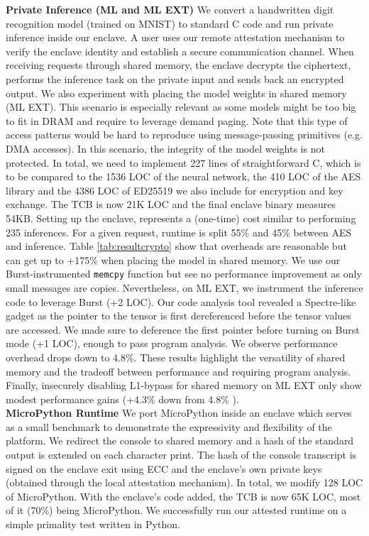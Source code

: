 \noindent\textbf{Private Inference (ML and ML EXT)}
\label{sec:evalprivateinference}
We convert a handwritten digit recognition model (trained on MNIST) to standard C code \cite{onnx2cgithub} and run private inference inside our enclave.
A user uses our remote attestation mechanism to verify the enclave identity and establish a secure communication channel.
When receiving requests through shared memory, the enclave decrypts the ciphertext, performs the inference task on the private input and sends back an encrypted output.
We also experiment with placing the model weights in shared memory (ML EXT).
This scenario is especially relevant as some models might be too big to fit in DRAM and require to leverage demand paging. 
Note that this type of access patterns would be hard to reproduce using message-passing primitives (e.g. DMA accesses).
In this scenario, the integrity of the model weights is not protected.
In total, we need to implement 227 lines of straightforward C, which is to be compared to the 1536 LOC of the neural network, the 410 LOC of the AES library and the 4386 LOC of ED25519 we also include
for encryption and key exchange.
The TCB is now 21K LOC and the final enclave binary measures 54KB.
Setting up the enclave, represents a (one-time) cost similar to performing 235 inferences.
For a given request, runtime is split 55\% and 45\% between AES and inference.
Table \ref{tab:resultcrypto} show that overheads are reasonable but can get up to +175\% when placing the model in shared memory.
We use our Burst-instrumented \texttt{memcpy} function but see no performance improvement as only small messages are copies.
Nevertheless, on ML EXT, we instrument the inference code to leverage Burst (+2 LOC).
Our code analysis tool revealed a Spectre-like gadget as the pointer to the tensor is first dereferenced before the tensor values are accessed.
We made sure to deference the first pointer before turning on Burst mode (+1 LOC), enough to pass program analysis.
We observe performance overhead drops down to 4.8\%. 
These results highlight the versatility of shared memory and the tradeoff between performance and requiring program analysis.
Finally, insecurely disabling L1-bypass for shared memory on ML EXT only show modest performance gains (+4.3\% down from 4.8\% ).
\\ 

\noindent\textbf{MicroPython Runtime}
\label{sec:evalmicropython}
We port MicroPython \cite{microphython} inside an enclave
which serves as a small benchmark to demonstrate the expressivity and flexibility of the platform.
We redirect the console to shared memory and a hash of the standard output is extended on each character print.
The hash of the console transcript is signed on the enclave exit using ECC and the enclave's own private keys (obtained through the local attestation mechanism).
In total, we modify 128 LOC of MicroPython.
With the enclave's code added, the TCB is now 65K LOC, most of it (70\%) being MicroPython.
We successfully run our attested runtime on a simple primality test written in Python.

